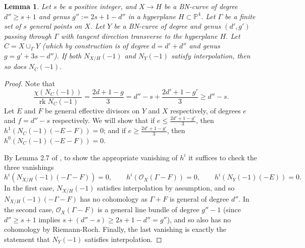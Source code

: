 \documentclass[11pt]{amsart}
\newcommand{\pp}{\mathbb{P}}
\renewcommand{\O}{\mathcal{O}}
\newcommand{\rk}{\operatorname{rk}}
\newtheorem{lem}[thm]{Lemma}
\theoremstyle{definition}
\theoremstyle{remark}
\begin{document}
\begin{lem}\label{in_transverse}
Let $s$ be a positive integer, and
$X \to H$ be a BN-curve of degree $d'' \geq s + 1$
and genus $g'' := 2s + 1 - d''$
in a hyperplane $H \subset \pp^4$.  Let $\Gamma$ be a finite set of $s$ general points on $X$.  Let $Y$ be a BN-curve of degree and genus $(d', g')$ passing through $\Gamma$ with tangent direction transverse to the hyperplane $H$.  Let $C = X \cup _{\Gamma} Y$
(which by construction is of degree $d = d' + d''$ and genus $g = g' + 3s - d''$).
If both $N_{X/H}(-1)$ and $N_Y(-1)$ satisfy interpolation, then so does $N_{C}(-1)$.
\end{lem}
\begin{proof}
Note that
\[\frac{\chi(N_{C}(-1))}{\rk N_C(-1)} = \frac{2d + 1 - g}{3} = d'' - s + \frac{2d' + 1 - g'}{3} \geq d'' - s.\]
Let $E$ and $F$ be general effective divisors on $Y$ and $X$ respectively,
of degrees $e$ and $f = d'' - s$ respectively.
We will show that if $e \leq \frac{2d' + 1 - g'}{3}$, then $h^1(N_C(-1)(-E-F)) = 0$; and if $e \geq \frac{2d' + 1 - g'}{3}$, then $h^0(N_C(-1)(-E-F)) = 0$.

By Lemma 2.7 of \cite{quadrics}, to show the appropriate vanishing of $h^i$ it suffices to check the three vanishings
\begin{equation}\label{hi}
h^i(N_{X/H}(-1)(-\Gamma-F)) = 0, \qquad h^i(\O_X(\Gamma - F)) = 0, \qquad h^i(N_Y(-1)(-E)) =0.
\end{equation}
In the first case, $N_{X/H}(-1)$ satisfies interpolation by assumption, and so $N_{X/H}(-1)(-\Gamma - F)$ has no cohomology as $\Gamma + F$ is general of degree $d''$.  In the second case, $\O_X(\Gamma - F)$ is a general line bundle of degree $g'' - 1$ (since $d'' \geq s + 1$ implies $s + (d'' - s) \geq 2s + 1 - d'' = g''$), and so also has no cohomology by Riemann-Roch.  Finally, the last vanishing is exactly the statement that $N_Y(-1)$ satisfies interpolation.
\end{proof}
\end{document}
